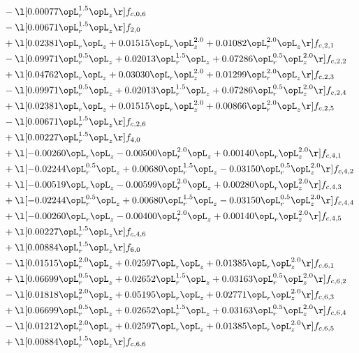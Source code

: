 \begin{alignat}{2}
& - \l[  0.00077 \opL_r^{1.5} \opL_z  \r] f_{c,0,6} \nonumber \\ 
& - \l[  0.00671 \opL_r^{1.5} \opL_z  \r] f_{2,0} \nonumber \\ 
& + \l[  0.02381 \opL_r \opL_z +  0.01515 \opL_r \opL_z^{2.0} +  0.01082 \opL_r^{2.0} \opL_z  \r] f_{c,2,1} \nonumber \\ 
& - \l[  0.09971 \opL_r^{0.5} \opL_z +  0.02013 \opL_r^{1.5} \opL_z +  0.07286 \opL_r^{0.5} \opL_z^{2.0}  \r] f_{c,2,2} \nonumber \\ 
& + \l[  0.04762 \opL_r \opL_z +  0.03030 \opL_r \opL_z^{2.0} +  0.01299 \opL_r^{2.0} \opL_z  \r] f_{c,2,3} \nonumber \\ 
& - \l[  0.09971 \opL_r^{0.5} \opL_z +  0.02013 \opL_r^{1.5} \opL_z +  0.07286 \opL_r^{0.5} \opL_z^{2.0}  \r] f_{c,2,4} \nonumber \\ 
& + \l[  0.02381 \opL_r \opL_z +  0.01515 \opL_r \opL_z^{2.0} +  0.00866 \opL_r^{2.0} \opL_z  \r] f_{c,2,5} \nonumber \\ 
& - \l[  0.00671 \opL_r^{1.5} \opL_z  \r] f_{c,2,6} \nonumber \\ 
& + \l[  0.00227 \opL_r^{1.5} \opL_z  \r] f_{4,0} \nonumber \\ 
& + \l[  -0.00260 \opL_r \opL_z   -0.00500 \opL_r^{2.0} \opL_z +  0.00140 \opL_r \opL_z^{2.0}  \r] f_{c,4,1} \nonumber \\ 
& + \l[  -0.02244 \opL_r^{0.5} \opL_z +  0.00680 \opL_r^{1.5} \opL_z   -0.03150 \opL_r^{0.5} \opL_z^{2.0}  \r] f_{c,4,2} \nonumber \\ 
& + \l[  -0.00519 \opL_r \opL_z   -0.00599 \opL_r^{2.0} \opL_z +  0.00280 \opL_r \opL_z^{2.0}  \r] f_{c,4,3} \nonumber \\ 
& + \l[  -0.02244 \opL_r^{0.5} \opL_z +  0.00680 \opL_r^{1.5} \opL_z   -0.03150 \opL_r^{0.5} \opL_z^{2.0}  \r] f_{c,4,4} \nonumber \\ 
& + \l[  -0.00260 \opL_r \opL_z   -0.00400 \opL_r^{2.0} \opL_z +  0.00140 \opL_r \opL_z^{2.0}  \r] f_{c,4,5} \nonumber \\ 
& + \l[  0.00227 \opL_r^{1.5} \opL_z  \r] f_{c,4,6} \nonumber \\ 
& + \l[  0.00884 \opL_r^{1.5} \opL_z  \r] f_{6,0} \nonumber \\ 
& - \l[  0.01515 \opL_r^{2.0} \opL_z +  0.02597 \opL_r \opL_z +  0.01385 \opL_r \opL_z^{2.0}  \r] f_{c,6,1} \nonumber \\ 
& + \l[  0.06699 \opL_r^{0.5} \opL_z +  0.02652 \opL_r^{1.5} \opL_z +  0.03163 \opL_r^{0.5} \opL_z^{2.0}  \r] f_{c,6,2} \nonumber \\ 
& - \l[  0.01818 \opL_r^{2.0} \opL_z +  0.05195 \opL_r \opL_z +  0.02771 \opL_r \opL_z^{2.0}  \r] f_{c,6,3} \nonumber \\ 
& + \l[  0.06699 \opL_r^{0.5} \opL_z +  0.02652 \opL_r^{1.5} \opL_z +  0.03163 \opL_r^{0.5} \opL_z^{2.0}  \r] f_{c,6,4} \nonumber \\ 
& - \l[  0.01212 \opL_r^{2.0} \opL_z +  0.02597 \opL_r \opL_z +  0.01385 \opL_r \opL_z^{2.0}  \r] f_{c,6,5} \nonumber \\ 
& + \l[  0.00884 \opL_r^{1.5} \opL_z  \r] f_{c,6,6} \nonumber \\ 
\end{alignat} 


